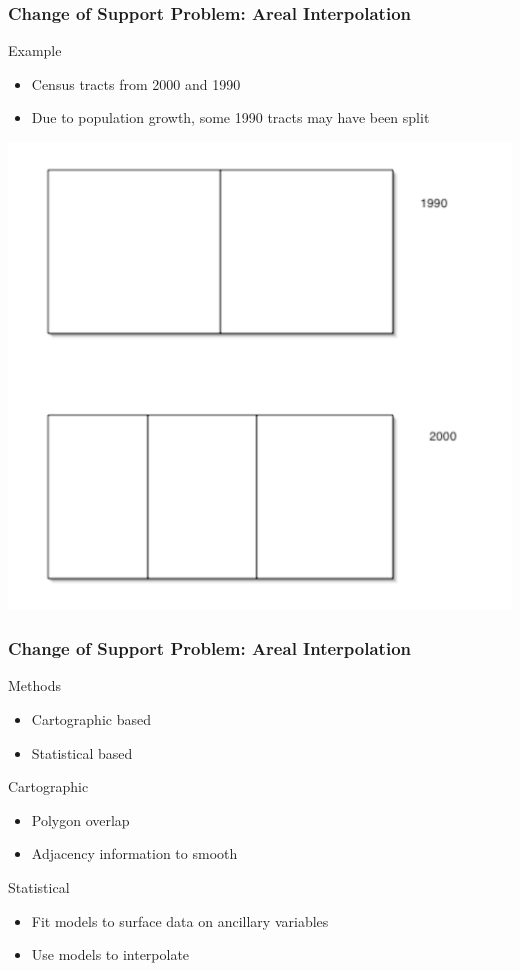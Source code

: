 \documentclass[nototal]{beamer}
\begin{document}
 \begin{frame}[<+->]
  \frametitle{Change of Support Problem: Areal Interpolation}

\begin{block}{Example}
     \begin{itemize}
       \item Census tracts from 2000 and 1990
       \item Due to population growth, some 1990 tracts may have been split
     \end{itemize}
    \end{block}
\begin{block}{}
    \begin{center}
      \includegraphics[width=.45\linewidth]{arealinterpolation}
    \end{center}
\end{block}
  \end{frame}

 \begin{frame}[<+->]
 \frametitle{Change of Support Problem: Areal Interpolation}
\begin{block}{Methods}
     \begin{itemize}
       \item Cartographic based
       \item Statistical based
     \end{itemize}
    \end{block}
\begin{block}{Cartographic}
  \begin{itemize}
    \item Polygon overlap
    \item Adjacency information to smooth
  \end{itemize}
\end{block}
\begin{block}{Statistical}
  \begin{itemize}
    \item Fit models to surface data on ancillary variables
    \item Use models to interpolate
  \end{itemize}
\end{block}

  \end{frame}
 
\end{document}
